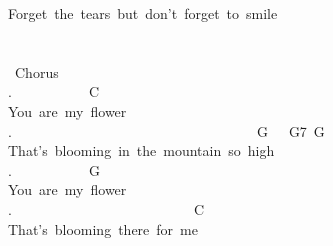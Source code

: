 {Forget\ the\ tears\ but\ don't\ forget\ to\ smile\\
\\
\\
\lbrack\ Chorus\rbrack\\
.\ \ \ \ \ \ \ \ \ \ \ C\\
You\ are\ my\ flower\\
.\ \ \ \ \ \ \ \ \ \ \ \ \ \ \ \ \ \ \ \ \ \ \ \ \ \ \ \ \ \ \ \ \ \ \ G\ \ \ G7\ G\\
That's\ blooming\ in\ the\ mountain\ so\ high\\
.\ \ \ \ \ \ \ \ \ \ \ G\\
You\ are\ my\ flower\\
.\ \ \ \ \ \ \ \ \ \ \ \ \ \ \ \ \ \ \ \ \ \ \ \ \ \ C\\
That's\ blooming\ there\ for\ me}
